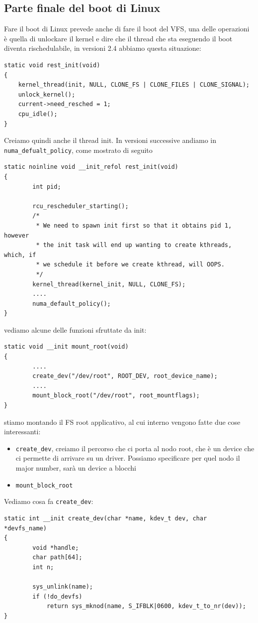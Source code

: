 \documentclass[12pt, oneside]{extbook}
\begin{document}
\subsection{Parte finale del boot di Linux}
Fare il boot di Linux prevede anche di fare il boot del VFS, una delle operazioni è quella di unlockare il kernel e dire che il thread che sta eseguendo il boot diventa rischedulabile, in versioni 2.4 abbiamo questa situazione:
\begin{lstlisting}
static void rest_init(void)
{
	kernel_thread(init, NULL, CLONE_FS | CLONE_FILES | CLONE_SIGNAL);
	unlock_kernel();
	current->need_resched = 1;
	cpu_idle();
}
\end{lstlisting}
Creiamo quindi anche il thread init. In versioni successive andiamo in \texttt{numa\_defualt\_policy}, come mostrato di seguito
\begin{lstlisting}
static noinline void __init_refol rest_init(void)
{
		int pid;
		
		rcu_rescheduler_starting();
		/*
		 * We need to spawn init first so that it obtains pid 1, however
		 * the init task will end up wanting to create kthreads, which, if
		 * we schedule it before we create kthread, will OOPS.
		 */
		kernel_thread(kernel_init, NULL, CLONE_FS);
		....
		numa_default_policy();
}
\end{lstlisting}
vediamo alcune delle funzioni sfruttate da init:\\
\begin{lstlisting}
static void __init mount_root(void)
{
		....
		create_dev("/dev/root", ROOT_DEV, root_device_name);
		....
		mount_block_root("/dev/root", root_mountflags);
}
\end{lstlisting}
stiamo montando il FS root applicativo, al cui interno vengono fatte due cose interessanti:
\begin{itemize}
	\item \texttt{create\_dev}, creiamo il percorso che ci porta al nodo root, che è un device che ci permette di arrivare su un driver. Possiamo specificare per quel nodo il major number, sarà un device a blocchi
	\item \texttt{mount\_block\_root}
\end{itemize}
Vediamo cosa fa \texttt{create\_dev}:
\begin{lstlisting}
static int __init create_dev(char *name, kdev_t dev, char 	*devfs_name)
{
		void *handle;
		char path[64];
		int n;
		
		sys_unlink(name);
		if (!do_devfs)
			return sys_mknod(name, S_IFBLK|0600, kdev_t_to_nr(dev));	
}
\end{lstlisting}
\end{document}
